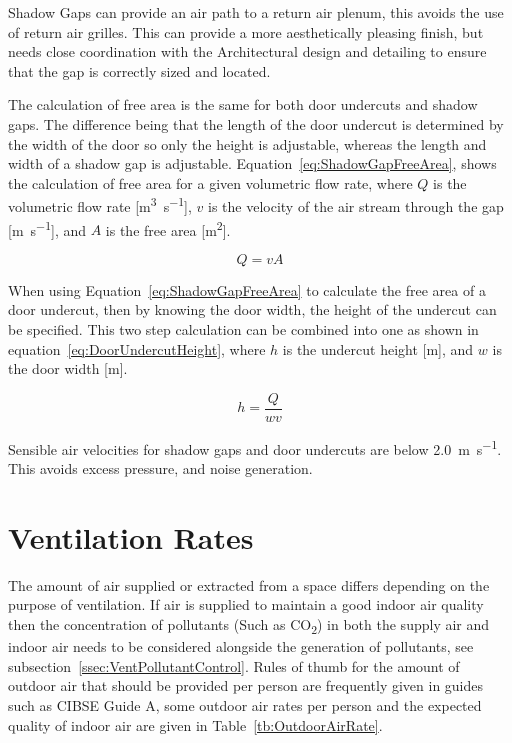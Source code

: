 Shadow Gaps can provide an air path to a return air plenum, this avoids the use of return air grilles.  This can provide a more aesthetically pleasing finish, but needs close coordination with the Architectural design and detailing to ensure that the gap is correctly sized and located.

The calculation of free area is the same for both door undercuts and shadow gaps.  The difference being that the length of the door undercut is determined by the width of the door so only the height is adjustable, whereas the length and width of a shadow gap is adjustable.  Equation~\ref{eq:ShadowGapFreeArea}, shows the calculation of free area for a given volumetric flow rate, where $Q$ is the volumetric flow rate [\si{\cubic\metre\per\second}], $v$ is the velocity of the air stream through the gap [\si{\metre\per\second}], and $A$ is the free area [\si{\square\metre}].

\begin{equation}\label{eq:ShadowGapFreeArea}
Q = v A
\end{equation}

When using Equation~\ref{eq:ShadowGapFreeArea} to calculate the free area of a door undercut, then by knowing the door width, the height of the undercut can be specified.  This two step calculation can be combined into one as shown in equation~\ref{eq:DoorUndercutHeight}, where $h$ is the undercut height [\si{\metre}], and $w$ is the door width [\si{\metre}].

\begin{equation}\label{eq:DoorUndercutHeight}
h = \frac{Q}{w v}
\end{equation}

Sensible air velocities for shadow gaps and door undercuts are below \SI{2.0}{\metre\per\second}.  This avoids excess pressure, and noise generation.

\section{Ventilation Rates}
\label{sec:ventRates}

The amount of air supplied or extracted from a space differs depending on the purpose of ventilation.  If air is supplied to maintain a good indoor air quality then the concentration of pollutants (Such as CO\textsubscript{2}) in both the supply air and indoor air needs to be considered alongside the generation of pollutants, see subsection~\ref{ssec:VentPollutantControl}.  Rules of thumb for the amount of outdoor air that should be provided per person are frequently given in guides such as \gls{CIBSE} Guide A, some outdoor air rates per person and the expected quality of indoor air are given in Table~\ref{tb:OutdoorAirRate}.

